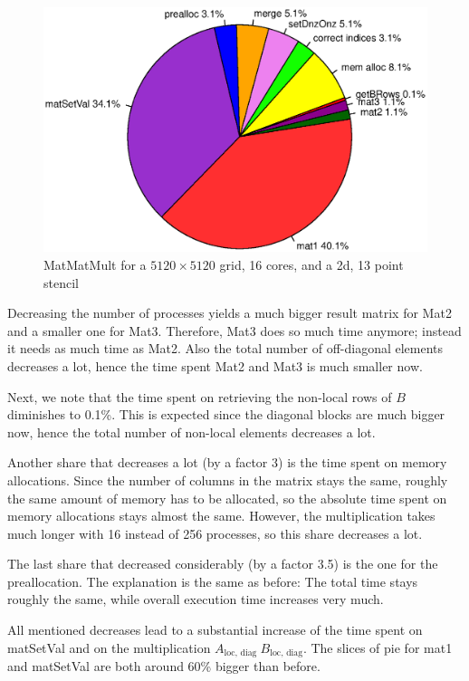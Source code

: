 \begin{figure}[tbp]
	\centering
	\includegraphics[width=1\textwidth, trim={0 3.5cm 0 3cm},clip]{16cores_5120}
	\caption{MatMatMult for a $5120 \times 5120$ grid, 16 cores, and a 2d, 13 point stencil} 
	\label{fig:pie_16_5120}
\end{figure}

Decreasing the number of processes yields a much bigger result matrix for Mat2 and a smaller one for Mat3. Therefore, Mat3 does so much time anymore; instead it needs as much time as Mat2. Also the total number of off-diagonal elements decreases a lot, hence the time spent Mat2 and Mat3 is much smaller now.

Next, we note that the time spent on retrieving the non-local rows of $B$ diminishes to 0.1\%. This is expected since the diagonal blocks are much bigger now, hence the total number of non-local elements decreases a lot. 

Another share that decreases a lot (by a factor 3) is the time spent on memory allocations. Since the number of columns in the matrix stays the same, roughly the same amount of memory has to be allocated, so the absolute time spent on memory allocations stays almost the same. However, the multiplication takes much longer with 16 instead of 256 processes, so this share decreases a lot. 

The last share that decreased considerably (by a factor 3.5) is the one for the preallocation. The explanation is the same as before: The total time stays roughly the same, while overall execution time increases very much.

All mentioned decreases lead to a substantial increase of the time spent on matSetVal and on the multiplication $A_{\textrm{loc, diag~}} B_{\textrm{loc, diag}}$. The slices of pie for mat1 and matSetVal are both  around 60\% bigger than before.


